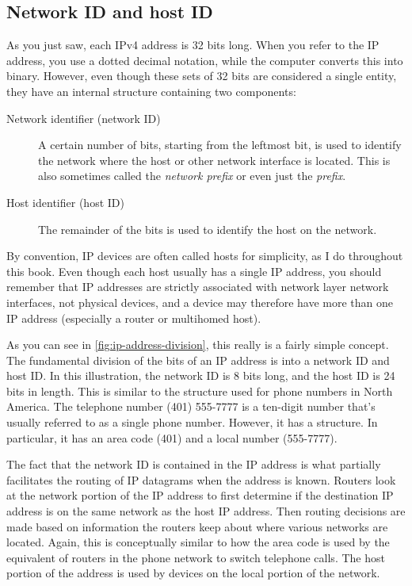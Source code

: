 \subsection{Network ID and host ID}

As you just saw, each IPv4 address is 32 bits long.
When you refer to the IP address, you use a dotted decimal notation, while the computer converts
this into binary. However, even though these sets of 32 bits are
considered a single entity, they have an internal structure containing
two components:
\begin{description}
   \item[Network identifier (network ID)]
      A certain number of bits, starting from the leftmost bit, is used to identify the network where the host or other network interface is located. This is also sometimes called the \emph{network prefix} or even just the \emph{prefix}.
   \item[Host identifier (host ID)]
      The remainder of the bits is used to identify the host on the network.
\end{description}

\begin{note}
By convention, IP devices are often called hosts for simplicity, as I do throughout this book.
Even though each host usually has a single IP address, you should remember that IP addresses are strictly associated with network layer network interfaces,
not physical devices, and a device may therefore have more than one IP address (especially a router or multihomed host).
\end{note}

As you can see in \cref{fig:ip-address-division},
this really is a fairly simple concept. The fundamental division of the
bits of an IP address is into a network ID and host ID. In this
illustration, the network ID is 8 bits long, and the host ID is 24 bits
in length. This is similar to the structure used for phone numbers in
North America. The telephone number (401) 555-7777 is a ten-digit number
that's usually referred to as a single phone number. However, it has a
structure. In particular, it has an area code (401) and a local number
(555-7777).

The fact that the network ID is contained in the IP address is what
partially facilitates the routing of IP datagrams when the address is
known. Routers look at the network portion of the IP address to first
determine if the destination IP address is on the same network as the
host IP address. Then routing decisions are made based on information
the routers keep about where various networks are located. Again, this
is conceptually similar to how the area code is used by the equivalent
of routers in the phone network to switch telephone calls. The host
portion of the address is used by devices on the local portion of the
network.

